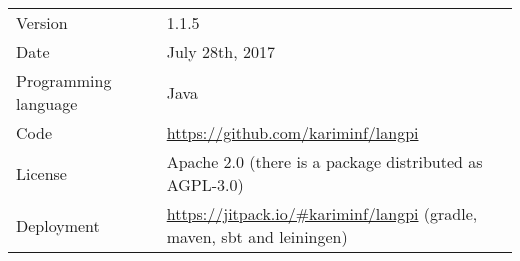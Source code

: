 \begin{tabular}{p{}p{}p{}} 
\hline \hline
Version && 1.1.5 \\
Date && July 28th, 2017\\
Programming language && Java \\
Code && \url{https://github.com/kariminf/langpi} \\
License && Apache 2.0 (there is a package distributed as AGPL-3.0) \\
Deployment && \url{https://jitpack.io/#kariminf/langpi} (gradle, maven, sbt and leiningen)\\

\hline \hline
\end{tabular}
